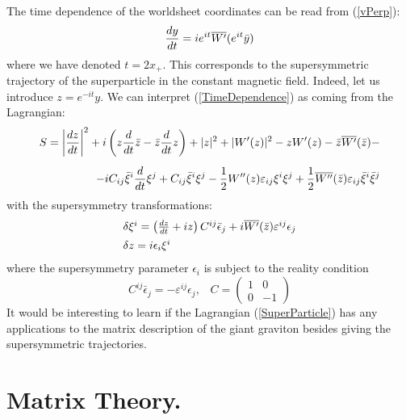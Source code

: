 \documentclass[a4paper,12pt]{article}
\begin{document}
The time dependence of the worldsheet coordinates can be read from
(\ref{vPerp}):
\begin{equation}\label{TimeDependence}
{dy\over dt}=ie^{it}\overline{W'}(e^{it}\bar{y})
\end{equation}
where we have denoted $t=2x_+$. This corresponds to the supersymmetric
trajectory of the superparticle in the constant magnetic field. Indeed,
let us introduce $z=e^{-it}y$.
We can interpret (\ref{TimeDependence}) as coming from the Lagrangian:
\begin{eqnarray}\label{SuperParticle}
S=\left|{dz\over dt}\right|^2+
i\left(z{d\over dt}\bar{z}-\bar{z}{d\over dt}z\right)+|z|^2+|W'(z)|^2-
zW'(z)-\bar{z}\overline{W'}(\bar{z})-\nonumber\\[5pt]
-iC_{ij}\bar{\xi}^i{d\over dt} \xi^j +C_{ij}\bar{\xi}^i\xi^j-
{1\over 2}W''(z)\varepsilon_{ij}\xi^i\xi^j+
{1\over 2}\overline{W''}(\bar{z})\varepsilon_{ij}\bar{\xi}^i\bar{\xi}^j
\end{eqnarray}
with the supersymmetry transformations:
\begin{equation}
\begin{array}{l}
\delta\xi^i=\left( {dz\over dt}+iz\right)C^{ij}\bar{\epsilon}_j+
i\overline{W'}(\bar{z})\varepsilon^{ij}\epsilon_j\\[5pt]
\delta z=i\epsilon_i\xi^i
\end{array}
\end{equation}
where the supersymmetry parameter $\epsilon_i$ is subject to the
reality condition
\begin{equation}
C^{ij}\bar{\epsilon}_j=-\varepsilon^{ij}\epsilon_j,\;\;\;
C=\left(\begin{array}{cc}1&0\\0&-1\end{array}\right)
\end{equation}
It would be interesting to learn if the Lagrangian (\ref{SuperParticle}) has any
applications to the matrix description of the giant graviton besides
giving the supersymmetric trajectories.

\section{Matrix Theory.}
\end{document}
